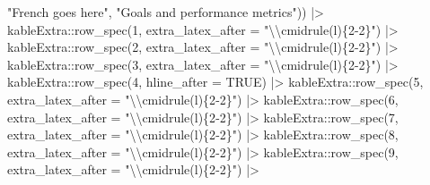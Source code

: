 \documentclass[12pt]{article}\usepackage[]{graphicx}\usepackage[]{color}
\newenvironment{Shaded}{\begin{snugshade}}{\end{snugshade}}
\newcommand{\AttributeTok}[1]{\textcolor[rgb]{0.77,0.63,0.00}{#1}}
\newcommand{\ConstantTok}[1]{\textcolor[rgb]{0.00,0.00,0.00}{#1}}
\newcommand{\DecValTok}[1]{\textcolor[rgb]{0.00,0.00,0.81}{#1}}
\newcommand{\FunctionTok}[1]{\textcolor[rgb]{0.00,0.00,0.00}{#1}}
\newcommand{\NormalTok}[1]{#1}
\newcommand{\SpecialCharTok}[1]{\textcolor[rgb]{0.00,0.00,0.00}{#1}}
\newcommand{\StringTok}[1]{\textcolor[rgb]{0.31,0.60,0.02}{#1}}
\begin{document}
\begin{Shaded}
\begin{Highlighting}[]
                              \StringTok{"French goes here"}\NormalTok{,}
                              \StringTok{"Goals and performance metrics"}\NormalTok{)) }\SpecialCharTok{|\textgreater{}}
\NormalTok{  kableExtra}\SpecialCharTok{::}\FunctionTok{row\_spec}\NormalTok{(}\DecValTok{1}\NormalTok{, }\AttributeTok{extra\_latex\_after =} \StringTok{"}\SpecialCharTok{\textbackslash{}\textbackslash{}}\StringTok{cmidrule(l)\{2{-}2\}"}\NormalTok{) }\SpecialCharTok{|\textgreater{}} 
\NormalTok{  kableExtra}\SpecialCharTok{::}\FunctionTok{row\_spec}\NormalTok{(}\DecValTok{2}\NormalTok{, }\AttributeTok{extra\_latex\_after =} \StringTok{"}\SpecialCharTok{\textbackslash{}\textbackslash{}}\StringTok{cmidrule(l)\{2{-}2\}"}\NormalTok{) }\SpecialCharTok{|\textgreater{}} 
\NormalTok{  kableExtra}\SpecialCharTok{::}\FunctionTok{row\_spec}\NormalTok{(}\DecValTok{3}\NormalTok{, }\AttributeTok{extra\_latex\_after =} \StringTok{"}\SpecialCharTok{\textbackslash{}\textbackslash{}}\StringTok{cmidrule(l)\{2{-}2\}"}\NormalTok{) }\SpecialCharTok{|\textgreater{}} 
\NormalTok{  kableExtra}\SpecialCharTok{::}\FunctionTok{row\_spec}\NormalTok{(}\DecValTok{4}\NormalTok{, }\AttributeTok{hline\_after =} \ConstantTok{TRUE}\NormalTok{) }\SpecialCharTok{|\textgreater{}} 
\NormalTok{  kableExtra}\SpecialCharTok{::}\FunctionTok{row\_spec}\NormalTok{(}\DecValTok{5}\NormalTok{, }\AttributeTok{extra\_latex\_after =} \StringTok{"}\SpecialCharTok{\textbackslash{}\textbackslash{}}\StringTok{cmidrule(l)\{2{-}2\}"}\NormalTok{) }\SpecialCharTok{|\textgreater{}} 
\NormalTok{  kableExtra}\SpecialCharTok{::}\FunctionTok{row\_spec}\NormalTok{(}\DecValTok{6}\NormalTok{, }\AttributeTok{extra\_latex\_after =} \StringTok{"}\SpecialCharTok{\textbackslash{}\textbackslash{}}\StringTok{cmidrule(l)\{2{-}2\}"}\NormalTok{) }\SpecialCharTok{|\textgreater{}} 
\NormalTok{  kableExtra}\SpecialCharTok{::}\FunctionTok{row\_spec}\NormalTok{(}\DecValTok{7}\NormalTok{, }\AttributeTok{extra\_latex\_after =} \StringTok{"}\SpecialCharTok{\textbackslash{}\textbackslash{}}\StringTok{cmidrule(l)\{2{-}2\}"}\NormalTok{) }\SpecialCharTok{|\textgreater{}} 
\NormalTok{  kableExtra}\SpecialCharTok{::}\FunctionTok{row\_spec}\NormalTok{(}\DecValTok{8}\NormalTok{, }\AttributeTok{extra\_latex\_after =} \StringTok{"}\SpecialCharTok{\textbackslash{}\textbackslash{}}\StringTok{cmidrule(l)\{2{-}2\}"}\NormalTok{) }\SpecialCharTok{|\textgreater{}} 
\NormalTok{  kableExtra}\SpecialCharTok{::}\FunctionTok{row\_spec}\NormalTok{(}\DecValTok{9}\NormalTok{, }\AttributeTok{extra\_latex\_after =} \StringTok{"}\SpecialCharTok{\textbackslash{}\textbackslash{}}\StringTok{cmidrule(l)\{2{-}2\}"}\NormalTok{) }\SpecialCharTok{|\textgreater{}} 

\end{Highlighting}
\end{Shaded}
\end{document}
